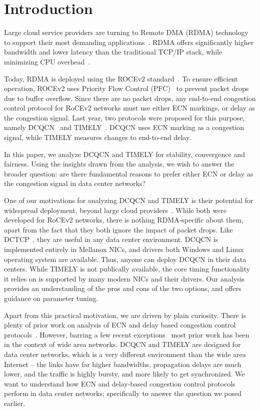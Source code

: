 \section{Introduction}

Large cloud service providers are turning to Remote DMA (RDMA) technology to
support their most demanding applications~\cite{dcqcn,timely,tcp-bolt}.  RDMA
offers significantly higher bandwidth and lower latency than the traditional
TCP/IP stack, while minimizing CPU overhead~\cite{dcqcn,farm,timely}. 

Today, RDMA is deployed using the ROCEv2 standard~\cite{rocev2}. To ensure
efficient operation, ROCEv2 uses Priority Flow Control (PFC)~\cite{pfc} to
prevent packet drops due to buffer overflow.  Since there are no packet drops,
any end-to-end congestion control protocol for RoCEv2 networks must use either
ECN markings, or delay as the congestion signal.  Last year, two protocols were
proposed for this purpose, namely DCQCN~\cite{dcqcn} and TIMELY~\cite{timely}.
DCQCN uses ECN marking as a congestion signal, while TIMELY measures changes to
end-to-end delay.


In this paper, we analyze DCQCN and TIMELY for stability, convergence and
fairness. Using the insights drawn from the analysis, we wish to answer the
broader question: are there fundamental reasons to prefer either ECN or delay as
the congestion signal in data center networks?


One of our motivations for analyzing DCQCN and TIMELY is their potential for
widespread deployment, beyond large cloud providers~\cite{dcqcn, timely}.  While
both were developed for RoCEv2 networks, there is nothing RDMA-specific about
them, apart from the fact that they both ignore the impact of packet drops. Like
DCTCP~\cite{dctcp}, they are useful in any data center environment.  DCQCN is
implemented entirely in Mellanox NICs, and drivers both Windows and Linux
operating system are available.  Thus, anyone can deploy DCQCN in their data
centers. While TIMELY is not publically available, the core timing functionality
it relies on is supported by many modern NICs and their drivers. Our analysis
provides an understanding of the pros and cons of the two options, and offers
guidance on parameter tuning.

Apart from this practical motivation, we are driven by plain curiosity. There is
plenty of prior work on analysis of ECN and delay based congestion control
protocols~\cite{ecn,
tcp-vegas,misra2000fluid,hollot2001designing,misra:TAC2002,gorinsky2004feedback}.
However, barring a few recent exceptions~\cite{dctcp-analysis, qcn-analysis}
most prior work has been in the context of wide area networks. DCQCN and TIMELY
are designed for data center networks, which is a very different environment
than the wide area Internet -- the links have far higher bandwidths, propagation
delays are much lower, and the traffic is highly bursty, and more likely to get
synchronized.  We want to understand how ECN and delay-based congestion control
protocols perform in data center networks; specifically to answer the question
we posed earlier.


